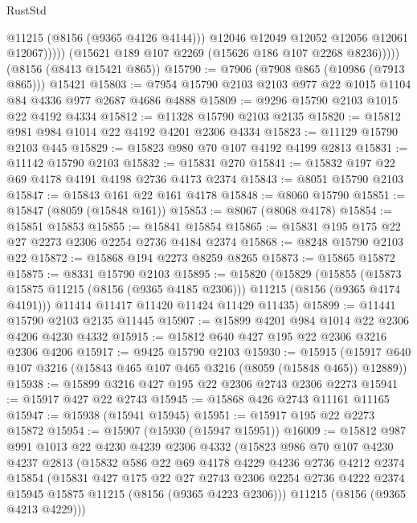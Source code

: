 \begin{lexlean}{RustStd}
\begin{coremodule}
                      @11215
                      (@8156 (@9365 @4126 @4144)))
                    @12046
                    @12049
                    @12052
                    @12056
                    @12061
                    @12067)))))
          (@15621 @189 @107 @2269 (@15626 @186 @107 @2268 @8236)))))
    (@8156 (@8413 @15421 @865))
@15790 := @7906 (@7908 @865 (@10986 (@7913 @865))) @15421
@15803 := @7954 @15790 @2103 @2103 @977 @22 @1015 @1104 @84 @4336 @977 @2687 @4686 @4888
@15809 := @9296 @15790 @2103 @1015 @22 @4192 @4334
@15812 := @11328 @15790 @2103 @2135
@15820 := @15812 @981 @984 @1014 @22 @4192 @4201 @2306 @4334
@15823 := @11129 @15790 @2103 @445
@15829 := @15823 @980 @70 @107 @4192 @4199 @2813
@15831 := @11142 @15790 @2103
@15832 := @15831 @270
@15841 := @15832 @197 @22 @69 @4178 @4191 @4198 @2736 @4173 @2374
@15843 := @8051 @15790 @2103
@15847 := @15843 @161 @22 @161 @4178
@15848 := @8060 @15790
@15851 := @15847 (@8059 (@15848 @161))
@15853 := @8067 (@8068 @4178)
@15854 := @15851 @15853
@15855 := @15841 @15854
@15865 := @15831 @195 @175 @22 @27 @2273 @2306 @2254 @2736 @4184 @2374
@15868 := @8248 @15790 @2103 @22
@15872 := @15868 @194 @2273 @8259 @8265
@15873 := @15865 @15872
@15875 := @8331 @15790 @2103
@15895 := @15820
    (@15829
      (@15855 (@15873 @15875 @11215 (@8156 (@9365 @4185 @2306))) @11215 (@8156 (@9365 @4174 @4191)))
      @11414
      @11417
      @11420
      @11424
      @11429
      @11435)
@15899 := @11441 @15790 @2103 @2135 @11445
@15907 := @15899 @4201 @984 @1014 @22 @2306 @4206 @4230 @4332
@15915 := @15812 @640 @427 @195 @22 @2306 @3216 @2306 @4206
@15917 := @9425 @15790 @2103
@15930 := @15915 (@15917 @640 @107 @3216 (@15843 @465 @107 @465 @3216 (@8059 (@15848 @465)) @12889))
@15938 := @15899 @3216 @427 @195 @22 @2306 @2743 @2306 @2273
@15941 := @15917 @427 @22 @2743
@15945 := @15868 @426 @2743 @11161 @11165
@15947 := @15938 (@15941 @15945)
@15951 := @15917 @195 @22 @2273 @15872
@15954 := @15907 (@15930 (@15947 @15951))
@16009 := @15812
    @987
    @991
    @1013
    @22
    @4230
    @4239
    @2306
    @4332
    (@15823
      @986
      @70
      @107
      @4230
      @4237
      @2813
      (@15832
        @586
        @22
        @69
        @4178
        @4229
        @4236
        @2736
        @4212
        @2374
        @15854
        (@15831
          @427
          @175
          @22
          @27
          @2743
          @2306
          @2254
          @2736
          @4222
          @2374
          @15945
          @15875
          @11215
          (@8156 (@9365 @4223 @2306)))
        @11215
        (@8156 (@9365 @4213 @4229)))

\end{coremodule}
\end{lexlean}
